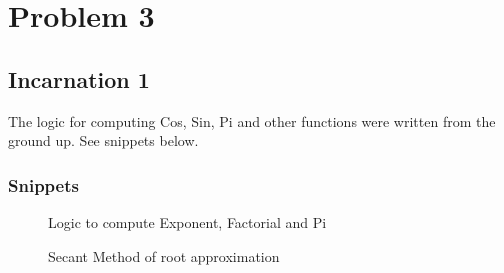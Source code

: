 \documentclass{report}
\begin{document}
\chapter{Problem 3}
\section{Incarnation 1}
  \begin{flushleft}
    The logic for computing Cos, Sin, Pi and other functions were written from the ground up. See snippets below.
  \end{flushleft}
  \subsection{Snippets}
  \vspace{2em}
    \begin{figure}[h!]
      \centering
      \caption{Logic to compute Exponent, Factorial and Pi}
      \label{fig:Math Library}
    \end{figure}
    \pagebreak
    \begin{figure}[h!]
      \centering
      \caption{Secant Method of root approximation}
      \label{fig:Root Approximation}
    \end{figure}
\end{document}
